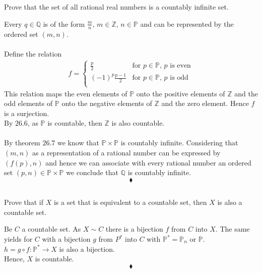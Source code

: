 \subsection{}
\begin{tcolorbox}
Prove that the set of all rational real numbers is a countably infinite set. 
\end{tcolorbox}
$$ $$
Every $q\in \mathbb{Q}$ is of the form $\frac{m}{n},\, m\in\mathbb{Z},\, n\in \mathbb{P}$ and can be represented by the ordered set $(m,n)$.\\\\
Define the relation
\begin{align*}
f=\left\{\begin{array}{ll}
\frac{p}{2}&\text{for } p\in \mathbb{P},\, p\text{ is even}\\
(-1)^{p}\frac{p-1}{2}&\text{for } p\in \mathbb{P},\, p\text{ is odd}\\
\end{array}\right.
\end{align*}
This relation maps the even elements of $\mathbb{P}$ onto the positive elements of $\mathbb{Z}$ and the odd elements of $\mathbb{P}$ onto the negative elements of $\mathbb{Z}$ and the zero element. Hence $f$ is a surjection.\\
By $\mathbf{26.6}$, as $\mathbb{P}$ is countable, then $\mathbb{Z}$ is also countable.\\\\
By theorem $\mathbf{26.7}$ we know that $\mathbb{P}\times \mathbb{P}$ is countably infinite. Considering that $(m,n)$ as a representation of a rational number can be expressed by $(f(p), n)$ and hence we can associate with every rational number an ordered set $(p,n)\in \mathbb{P}\times \mathbb{P}$ we conclude that $\mathbb{Q}$ is countably infinite.
$$\blacklozenge$$

\subsection{}
\begin{tcolorbox}
Prove that if $X$ is a set that is equivalent to a countable set, then $X$ is also a countable set. 
\end{tcolorbox}
$$ $$
Be $C$ a countable set. As $X\sim C$ there is a bijection $f$ from  $C$ into $X$. The same yields for $C$ with a bijection $g$ from $P^*$ into $C$ with $\mathbb{P}^* = \mathbb{P}_n$ or $\mathbb{P}$.\\
$h=g\circ f:\mathbb{P}^* \rightarrow X$ is also a bijection.\\
Hence, $X$ is countable. 
$$\blacklozenge$$

